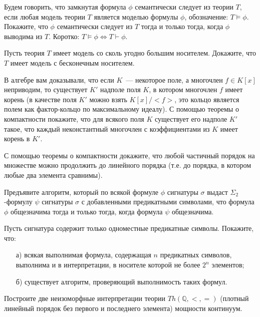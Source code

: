 
\begin{task}
	Будем говорить, что замкнутая формула $\phi$ семантически следует из теории $T$, если любая модель теории $T$
    является моделью формулы $\phi$, обозначение: $T \models \phi$. Покажите, что $\phi$ семантически следует из $T$
    тогда и только тогда, когда $\phi$ выводима из $T$. Коротко: $T \models \phi \iff T \vdash \phi$. 
\end{task}


\begin{task}
    Пусть теория $T$ имеет модель со сколь угодно большим носителем. Докажите, что $T$ имеет модель с бесконечным
    носителем.
\end{task}


\begin{task}
    В алгебре вам доказывали, что если $K$~--- некоторое поле, а многочлен $f \in K[x]$ неприводим, то существует $K'$
    надполе поля $K$, в котором многочлен $f$ имеет корень (в качестве поля $K'$ можно взять $K[x] / {<}f{>}$, это
    кольцо является полем как фактор-кольцо по максимальному идеалу). С помощью теоремы о компактности покажите, что для
    всякого поля $K$ существует его надполе $K'$ такое, что каждый неконстантный многочлен с коэффициентами из $K$ имеет
    корень в $K'$.
\end{task}

\begin{task}
    С помощью теоремы о компактности докажите, что любой частичный порядок на множестве можно продолжить до линейного
    порядка (т.е. до порядка, в котором любые два элемента сравнимы).
\end{task}


\begin{task}
	Предъявите алгоритм, который по всякой формуле $\phi$ сигнатуры $\sigma$ выдаст $\Sigma_2$-формулу $\psi$ сигнатуры
    $\sigma$ с добавленными предикатными символами, что формула $\phi$ общезначима тогда и только тогда, когда формула
    $\psi$ общезначима.
\end{task}


\breakline


\begin{ptask}{59}
	Пусть сигнатура содержит только одноместные предикатные символы. Покажите, что:
    \begin{enumerate}[topsep = 0pt, itemsep = -1ex]
        \item [а)] всякая выполнимая формула, содержащая $n$ предикатных символов, выполнима и в интерпретации, в
			носителе которой не более $2^n$ элементов;
        \item [б)] существует алгоритм, проверяющий выполнимость таких формул.
    \end{enumerate}
\end{ptask}


\begin{ptask}{63}
    Построите две неизоморфные интерпретации теории $Th(\mathbb{Q}, <, =)$ (плотный линейный порядок без первого и
    последнего элемента) мощности континуум.
\end{ptask}
